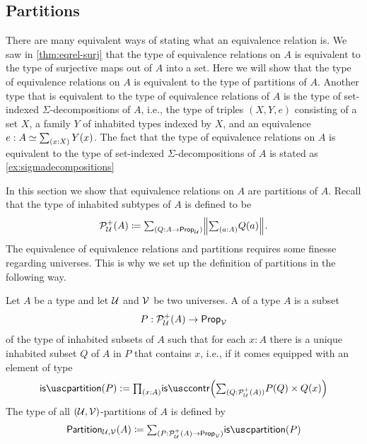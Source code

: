 \subsection{Partitions}

There are many equivalent ways of stating what an equivalence relation is. We saw in \cref{thm:eqrel-surj} that the type of equivalence relations on $A$ is equivalent to the type of surjective maps out of $A$ into a set. Here we will show that the type of equivalence relations on $A$ is equivalent to the type of partitions of $A$. Another type that is equivalent to the type of equivalence relations of $A$ is the type of set-indexed $\Sigma$-decompositions of $A$, i.e., the type of triples $(X,Y,e)$ consisting of a set $X$, a family $Y$ of inhabited types indexed by $X$, and an equivalence $e:A\simeq \sm{x:X}Y(x)$. The fact that the type of equivalence relations on $A$ is equivalent to the type of set-indexed $\Sigma$-decompositions of $A$ is stated as \cref{ex:sigmadecompositions}

In this section we show that equivalence relations on $A$ are partitions of $A$. Recall that the type of inhabited subtypes of $A$ is defined to be
\begin{equation*}
  \mathcal{P}_{\mathcal{U}}^+(A)\defeq\sm{Q:A\to\prop_\UU}\Brck{\sm{a:A}Q(a)}.
\end{equation*}
The equivalence of equivalence relations and partitions requires some finesse regarding universes. This is why we set up the definition of partitions in the following way.

\begin{defn}
  Let $A$ be a type and let $\mathcal{U}$ and $\mathcal{V}$ be two universes. A  of a type $A$ is a subset
  \begin{equation*}
    P:\mathcal{P}_{\mathcal{U}}^+(A)\to\mathsf{Prop}_{\mathcal{V}}
  \end{equation*}
  of the type of inhabited subsets of $A$ such that for each $x:A$ there is a unique inhabited subset $Q$ of $A$ in $P$ that contains $x$, i.e., if it comes equipped with an element of type
  \begin{equation*}
    \ispartition(P):=\prd{x:A}\iscontr\Big(\sm{Q:\mathcal{P}_{\UU}^+(A)}P(Q)\times Q(x)\Big)
  \end{equation*}
  The type of all $(\mathcal{U},\mathcal{V})$-partitions of $A$ is defined by
  \begin{equation*}
    \partition_{\UU,\VV}(A)\defeq\sm{P:\mathcal{P}_{\UU}^+(A)\to\prop_{\VV}}\ispartition(P)
  \end{equation*}
\end{defn}

